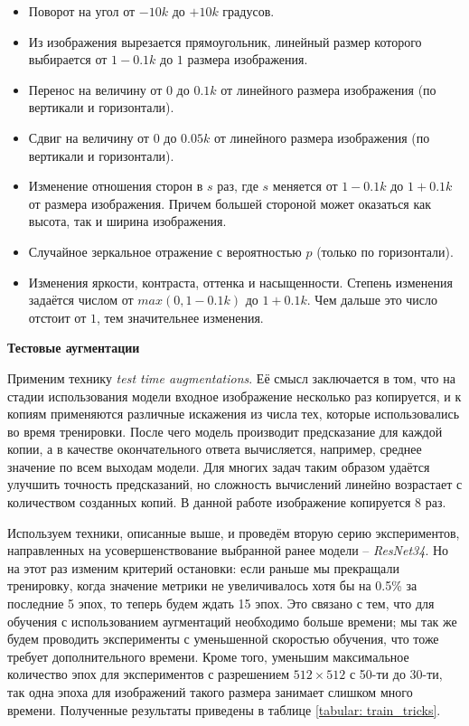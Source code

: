 \begin{itemize}

    \item Поворот на угол от $-10k$ до $+10k$ градусов.

    \item Из изображения вырезается прямоугольник, линейный размер
    которого выбирается от $1 - 0.1k$ до $1$ размера изображения.
    
    \item Перенос на величину от $0$ до $0.1k$ от линейного
    размера изображения (по вертикали и горизонтали).
    
    \item Сдвиг на величину от $0$ до $0.05k$ от линейного
    размера изображения
    (по вертикали и горизонтали).
    
    \item Изменение отношения сторон в $s$ раз, где $s$ меняется
    от $1 - 0.1k$ до $1 + 0.1k$ от размера изображения.
    Причем большей стороной может оказаться как высота,
    так и ширина изображения.
    
    \item Случайное зеркальное отражение с вероятностью $p$
    (только по горизонтали).
    
    \item Изменения яркости, контраста, оттенка и насыщенности.
    Степень изменения задаётся числом от
    $max(0, 1 - 0.1k)$ до $1 + 0.1k$. Чем дальше это число отстоит от
    $1$, тем значительнее изменения.
    
\end{itemize}
    
    
\indent
\textbf{Тестовые аугментации}

\indent
Применим технику \textit{test time augmentations}.
Её смысл заключается в том, что на стадии использования модели
входное изображение
несколько раз копируется, и к копиям применяются различные 
искажения из числа тех, которые использовались во время тренировки.
После чего модель производит предсказание для каждой
копии, а в качестве окончательного ответа вычисляется, например, 
среднее значение по всем выходам модели. Для многих задач таким образом
удаётся улучшить точность предсказаний,
но сложность вычислений линейно возрастает
с количеством созданных копий.
В данной работе изображение копируется 8 раз.


\bigbreak
\indent
\indent
Используем техники, описанные выше, и проведём вторую серию 
экспериментов, направленных на усовершенствование
 выбранной ранее модели --
\textit{ResNet34}. Но на этот раз изменим критерий остановки: если раньше мы 
прекращали тренировку, когда значение метрики не увеличивалось хотя бы 
на 0.5\% за последние 5 эпох, то теперь будем ждать 15 эпох. Это связано
с тем, что для обучения с использованием аугментаций необходимо
больше времени; мы так же будем
проводить эксперименты с уменьшенной
скоростью обучения, что тоже требует дополнительного времени.
Кроме того, уменьшим максимальное количество эпох для экспериментов
с разрешением $512 \times 512$ с 50-ти до 30-ти, так одна эпоха 
для изображений такого размера занимает слишком много времени.
Полученные результаты приведены в таблице \ref{tabular: train_tricks}.


